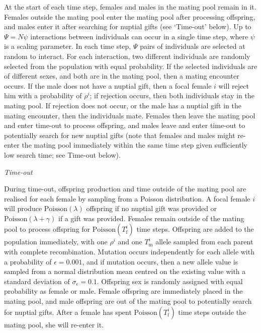 \documentclass[
]{article}
\begin{document}
At the start of each time step, females and males in the mating pool
remain in it. Females outside the mating pool enter the mating pool
after processing offspring, and males enter it after searching for
nuptial gifts (see `Time-out' below). Up to \(\Psi = N\psi\)
interactions between individuals can occur in a single time step, where
\(\psi\) is a scaling parameter. In each time step, \(\Psi\) pairs of
individuals are selected at random to interact. For each interaction,
two different individuals are randomly selected from the population with
equal probability. If the selected individuals are of different sexes,
and both are in the mating pool, then a mating encounter occurs. If the
male does not have a nuptial gift, then a focal female \(i\) will reject
him with a probability of \(\rho^{i}\); if rejection occurs, then both
individuals stay in the mating pool. If rejection does not occur, or the
male has a nuptial gift in the mating encounter, then the individuals
mate. Females then leave the mating pool and enter time-out to process
offspring, and males leave and enter time-out to potentially search for
new nuptial gifts (note that females and males might re-enter the mating
pool immediately within the same time step given sufficiently low search
time; see Time-out below).

\emph{Time-out}

During time-out, offspring production and time outside of the mating
pool are realised for each female by sampling from a Poisson
distribution. A focal female \(i\) will produce
\(\mathrm{Poisson}(\lambda)\) offspring if no nuptial gift was provided
or \(\mathrm{Poisson}(\lambda + \gamma)\) if a gift was provided.
Females remain outside of the mating pool to process offspring for
\(\mathrm{Poisson}(T^{i}_{\mathrm{f}})\) time steps. Offspring are added
to the population immediately, with one \(\rho^{i}\) and one
\(T^{i}_{\mathrm{m}}\) allele sampled from each parent with complete
recombination. Mutation occurs independently for each allele with a
probability of \(\epsilon = 0.001\), and if mutation occurs, then a new
allele value is sampled from a normal distribution mean centred on the
existing value with a standard deviation of \(\sigma_{\epsilon} = 0.1\).
Offspring sex is randomly assigned with equal probability as female or
male. Female offspring are immediately placed in the mating pool, and
male offspring are out of the mating pool to potentially search for
nuptial gifts. After a female has spent
\(\mathrm{Poisson}(T^{i}_{\mathrm{f}})\) time steps outside the mating
pool, she will re-enter it.
\end{document}
